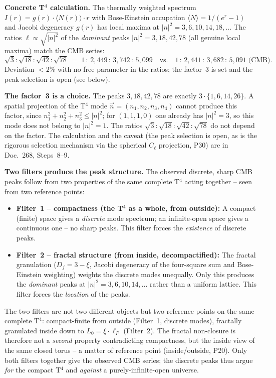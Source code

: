 \textbf{Concrete T$^4$ calculation.}
The thermally weighted spectrum $I(r) = g(r)\cdot\langle N(r)\rangle\cdot r$
with Bose-Einstein occupation $\langle N\rangle = 1/(e^r-1)$ and Jacobi
degeneracy $g(r)$ has local maxima at $|n|^2 = 3, 6, 10, 14, 18, \ldots$
The ratios $\ell \propto \sqrt{|n|^2}$ of the \emph{dominant} peaks
$|n|^2 = 3, 18, 42, 78$ (all genuine local maxima) match the CMB series:
\[
  \sqrt{3}:\sqrt{18}:\sqrt{42}:\sqrt{78}
  \;=\; 1\,:\,2{,}449\,:\,3{,}742\,:\,5{,}099
  \quad\text{vs.}\quad
  1\,:\,2{,}441\,:\,3{,}682\,:\,5{,}091\;\text{(CMB)}.
\]
Deviation $< 2\%$ with no free parameter in the ratios; the factor~3 is
set and the peak selection is open (see below).

\textbf{The factor~3 is a choice.}
The peaks $3, 18, 42, 78$ are exactly $3 \cdot \{1, 6, 14, 26\}$. A spatial
projection of the T$^4$ mode $\vec{n} = (n_1, n_2, n_3, n_4)$ cannot produce
this factor, since $n_1^2+n_2^2+n_3^2\le|n|^2$; for $(1,1,1,0)$ one already
has $|n|^2=3$, so this mode does not belong to $|n|^2=1$. The ratios
$\sqrt3:\sqrt{18}:\sqrt{42}:\sqrt{78}$ do not depend on the factor. The
calculation and the caveat (the peak selection is open, as is the rigorous
selection mechanism via the spherical $C_\ell$ projection, P30) are in
Doc.~268, Steps~8--9.

\textbf{Two filters produce the peak structure.} The observed discrete,
sharp CMB peaks follow from two properties of the same complete T$^4$
acting together -- seen from two reference points:

\begin{itemize}
  \item \textbf{Filter~1 -- compactness (the T$^4$ as a whole, from outside):}
        A compact (finite) space gives a \emph{discrete} mode spectrum;
        an infinite-open space gives a continuous one -- no sharp peaks.
        This filter forces the \emph{existence} of discrete peaks.
  \item \textbf{Filter~2 -- fractal structure (from inside, decompactified):}
        The fractal granulation ($D_f = 3-\xi$, Jacobi degeneracy of the
        four-square sum and Bose-Einstein weighting) weights the discrete
        modes unequally. Only this produces the \emph{dominant} peaks at
        $|n|^2 = 3, 6, 10, 14, \ldots$ rather than a uniform lattice.
        This filter forces the \emph{location} of the peaks.
\end{itemize}

The two filters are not two different objects but two reference points
on the same complete T$^4$: compact-finite from outside (Filter~1,
discrete modes), fractally granulated inside down to $L_0 = \xi\cdot\ell_P$
(Filter~2). The fractal non-closure is therefore not a \emph{second}
property contradicting compactness, but the inside view of the same
closed torus -- a matter of reference point (inside/outside, P20). Only
both filters together give the observed CMB series; the discrete peaks
thus argue \emph{for} the compact T$^4$ and \emph{against} a
purely-infinite-open universe.

